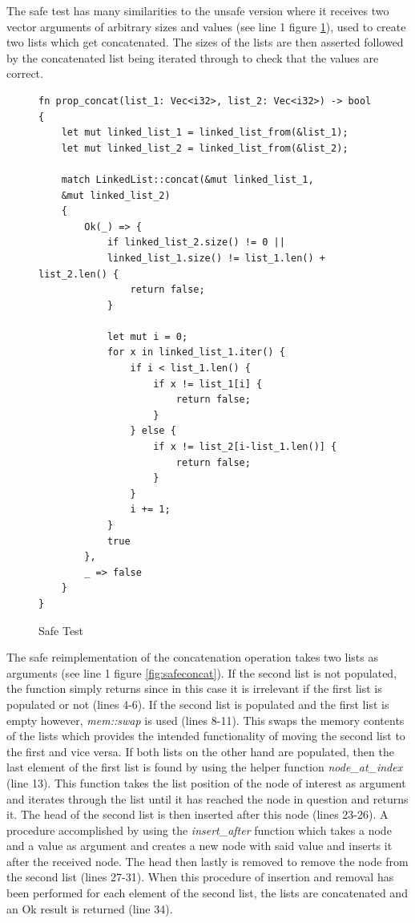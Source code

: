 \newpage

The safe test has many similarities to the unsafe version where it receives two vector arguments of arbitrary sizes and values (see line 1 figure \ref{fig:safetest}), used to create two lists which get concatenated. The sizes of the lists are then asserted followed by the concatenated list being iterated through to check that the values are correct.

\begin{figure}[H]
 \vspace{12pt}
\begin{lstlisting}[style=RUSTSTYLE]
fn prop_concat(list_1: Vec<i32>, list_2: Vec<i32>) -> bool {
    let mut linked_list_1 = linked_list_from(&list_1);
    let mut linked_list_2 = linked_list_from(&list_2);
    
    match LinkedList::concat(&mut linked_list_1, 
    &mut linked_list_2) 
    {
        Ok(_) => {
            if linked_list_2.size() != 0 || 
            linked_list_1.size() != list_1.len() + list_2.len() {
                return false;
            }
            
            let mut i = 0;
            for x in linked_list_1.iter() {
                if i < list_1.len() {
                    if x != list_1[i] {
                        return false;
                    }
                } else {
                    if x != list_2[i-list_1.len()] {
                        return false;
                    }
                }
                i += 1;
            }
            true
        },
        _ => false
    }
}
\end{lstlisting}
    \caption{Safe Test}
    \label{fig:safetest}
\end{figure}

The safe reimplementation of the concatenation operation takes two lists as arguments (see line 1 figure \ref{fig:safeconcat}). If the second list is not populated, the function simply returns since in this case it is irrelevant if the first list is populated or not (lines 4-6). If the second list is populated and the first list is empty however, \textit{mem::swap} is used (lines 8-11). This swaps the memory contents of the lists which provides the intended functionality of moving the second list to the first and vice versa. If both lists on the other hand are populated, then the last element of the first list is found by using the helper function \textit{node\_at\_index} (line 13). This function takes the list position of the node of interest as argument and iterates through the list until it has reached the node in question and returns it. The head of the second list is then inserted after this node (lines 23-26). A procedure accomplished by using the \textit{insert\_after} function which takes a node and a value as argument and creates a new node with said value and inserts it after the received node. The head then lastly is removed to remove the node from the second list (lines 27-31). When this procedure of insertion and removal has been performed for each element of the second list, the lists are concatenated and an Ok result is returned (line 34).

